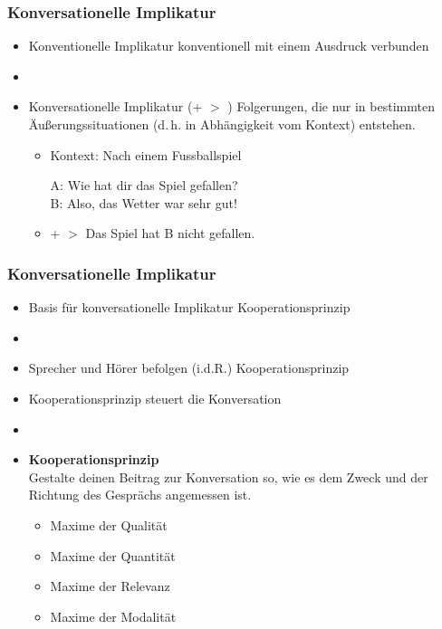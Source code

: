
\begin{frame}
\frametitle{Konversationelle Implikatur}

\begin{itemize}
	\item Konventionelle Implikatur \ras konventionell mit einem Ausdruck verbunden
	\item[]
	\item Konversationelle Implikatur (+ $>$ ) \ras
Folgerungen, die nur in bestimmten Äu\ss{}erungssituationen (d.\,h. in Abhängigkeit vom Kontext) entstehen.

\vspace{5mm}

	\begin{itemize}
		\item Kontext: Nach einem Fussballspiel
		
		\ea A: Wie hat dir das Spiel gefallen?\\
B: Also, das Wetter war sehr gut!
		\z

		\item[] + $>$ Das Spiel hat B nicht gefallen.
	\end{itemize}
	
\end{itemize}

\end{frame}



\begin{frame}
\frametitle{Konversationelle Implikatur}

\begin{itemize}
	\item Basis für konversationelle Implikatur \ras Kooperationsprinzip
	\item[]
	\item Sprecher und Hörer befolgen (i.d.R.) Kooperationsprinzip
	\item Kooperationsprinzip steuert die Konversation
	\item[]
	\item \textbf{Kooperationsprinzip}\\
Gestalte deinen Beitrag zur Konversation so, wie es dem Zweck und der Richtung des Gesprächs angemessen ist.

	\begin{itemize}
	\item Maxime der Qualität
	\item Maxime der Quantität
	\item Maxime der Relevanz
	\item Maxime der Modalität
	\end{itemize}
	
\end{itemize}

\end{frame}


